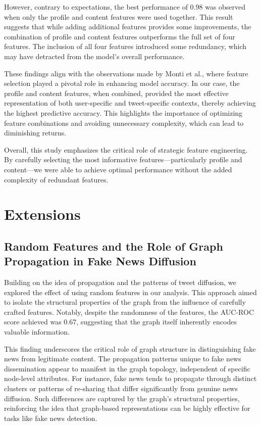 \documentclass[sigconf,nonacm]{acmart}
\begin{document}
However, contrary to expectations, the best performance of 0.98 was observed when only the profile and content features were used together. This result suggests that while adding additional features provides some improvements, the combination of profile and content features outperforms the full set of four features. The inclusion of all four features introduced some redundancy, which may have detracted from the model’s overall performance. 

These findings align with the observations made by Monti et al., where feature selection played a pivotal role in enhancing model accuracy. In our case, the profile and content features, when combined, provided the most effective representation of both user-specific and tweet-specific contexts, thereby achieving the highest predictive accuracy. This highlights the importance of optimizing feature combinations and avoiding unnecessary complexity, which can lead to diminishing returns. 

Overall, this study emphasizes the critical role of strategic feature engineering. By carefully selecting the most informative features—particularly profile and content—we were able to achieve optimal performance without the added complexity of redundant features.

\section{Extensions}

\subsection{Random Features and the Role of Graph Propagation in Fake News Diffusion}

Building on the idea of propagation and the patterns of tweet diffusion, we explored the effect of using random features in our analysis. This approach aimed to isolate the structural properties of the graph from the influence of carefully crafted features. Notably, despite the randomness of the features, the AUC-ROC score achieved was 0.67, suggesting that the graph itself inherently encodes valuable information.

This finding underscores the critical role of graph structure in distinguishing fake news from legitimate content. The propagation patterns unique to fake news dissemination appear to manifest in the graph topology, independent of specific node-level attributes. For instance, fake news tends to propagate through distinct clusters or patterns of re-sharing that differ significantly from genuine news diffusion. Such differences are captured by the graph's structural properties, reinforcing the idea that graph-based representations can be highly effective for tasks like fake news detection.
\end{document}
